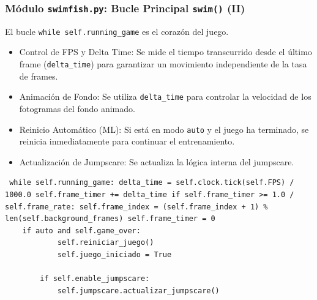 \documentclass[
	11pt, %
]{beamer}
\begin{document}

\begin{frame}[fragile] \frametitle{Módulo \texttt{swimfish.py}: Bucle Principal \texttt{swim()} (II)}

El bucle \texttt{while self.running_game} es el corazón del juego.

\begin{itemize} \item Control de FPS y Delta Time: Se mide el tiempo transcurrido desde el último frame (\texttt{delta_time}) para garantizar un movimiento independiente de la tasa de frames. \item Animación de Fondo: Se utiliza \texttt{delta_time} para controlar la velocidad de los fotogramas del fondo animado. \item Reinicio Automático (ML): Si está en modo \texttt{auto} y el juego ha terminado, se reinicia inmediatamente para continuar el entrenamiento. \item Actualización de Jumpscare: Se actualiza la lógica interna del jumpscare. \end{itemize}

\vspace{4pt} {\scriptsize \begin{verbatim} while self.running_game: delta_time = self.clock.tick(self.FPS) / 1000.0 self.frame_timer += delta_time if self.frame_timer >= 1.0 / self.frame_rate: self.frame_index = (self.frame_index + 1) % len(self.background_frames) self.frame_timer = 0
    if auto and self.game_over:
            self.reiniciar_juego()
            self.juego_iniciado = True

        if self.enable_jumpscare:
            self.jumpscare.actualizar_jumpscare()
\end{verbatim} } \end{frame}

\end{document}
